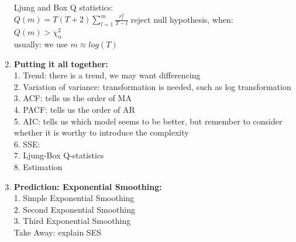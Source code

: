 \documentclass[10pt,landscape]{article}
\begin{document}
\begin{multicols}{3}
\begin{enumerate}
  		Ljung and Box Q statistics:\\
  		$
  		Q(m) = T(T+2)\sum_{l=1}^m \frac{r_l^2}{T-l}
  		$
  		reject null hypothesis, when:\\
  		$
  		Q(m)>\chi^2_\alpha
  		$\\
  		
  		usually: we use $m \approx log(T)$
  		
  		
  \item \textbf{Putting it all together:}\\
  		1. Trend: there is a trend, we may want differencing\\
  		2. Variation of variance: transformation is needed, such as log transformation\\
  		3. ACF: tells us the order of MA\\
  		4. PACF: tells us the order of AR\\
  		5. AIC: tells us which model seems to be better, but remember to consider whether it is worthy to introduce the complexity\\
  		6. SSE:\\
  		7. Ljung-Box Q-statistics\\
  		8. Estimation
  \item \textbf{Prediction: Exponential Smoothing:}\\
  		1. Simple Exponential Smoothing\\
  		2. Second Exponential Smoothing\\
  		3. Third Exponential Smoothing\\
  		Take Away: explain SES
\end{enumerate}

\end{multicols}

\end{document}
